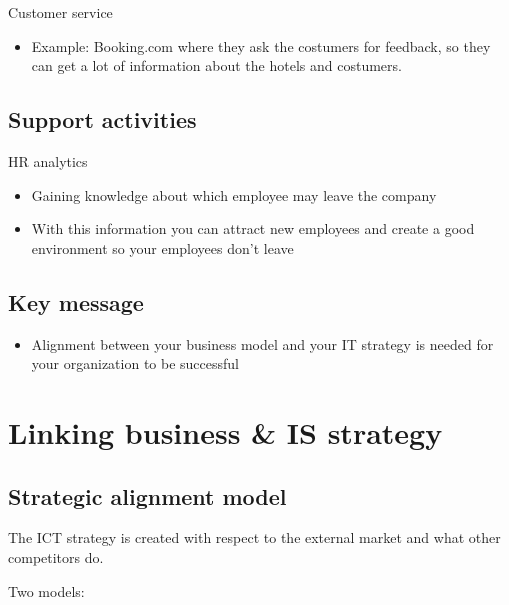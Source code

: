 \documentclass{article}
\begin{document}
Customer service

\begin{itemize}
\item  Example: Booking.com where they ask the costumers for feedback, so they can get a lot of information about the hotels and costumers. 
\end{itemize}

\subsection{Support activities}

HR analytics 

\begin{itemize}
\item  Gaining knowledge about which employee may leave the company

\item  With this information you can attract new employees and create a good environment so your employees don't leave
\end{itemize}

\subsection{Key message}

\begin{itemize}
\item  Alignment between your business model and your IT strategy is needed for your organization to be successful
\end{itemize}

\section{Linking business \& IS strategy}
 
\subsection{Strategic alignment model}

The ICT strategy is created with respect to the external market and what other competitors do.

\hfill \newline
Two models: 
\end{document}

